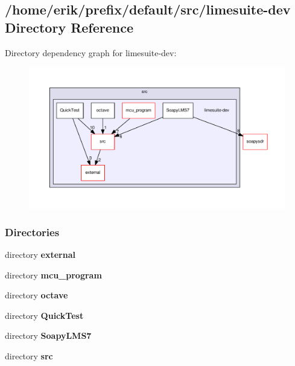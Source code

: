 \subsection{/home/erik/prefix/default/src/limesuite-\/dev Directory Reference}
\label{dir_b9105e5b97f4b271c74f586b556aeb2c}
Directory dependency graph for limesuite-\/dev\+:
\nopagebreak
\begin{figure}[H]
\begin{center}
\leavevmode
\includegraphics[width=350pt]{dir_b9105e5b97f4b271c74f586b556aeb2c_dep}
\end{center}
\end{figure}
\subsubsection*{Directories}
\begin{DoxyCompactItemize}
\item 
directory {\bf external}
\item 
directory {\bf mcu\+\_\+program}
\item 
directory {\bf octave}
\item 
directory {\bf Quick\+Test}
\item 
directory {\bf Soapy\+L\+M\+S7}
\item 
directory {\bf src}
\end{DoxyCompactItemize}
